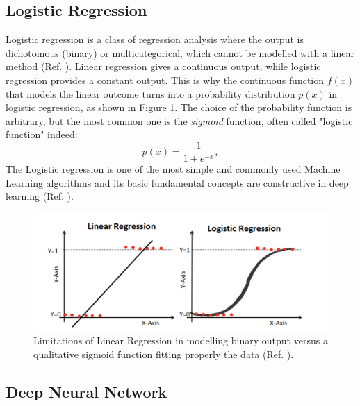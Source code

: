\documentclass[english,notitlepage,reprint,nofootinbib]{revtex4-1}  %
\begin{document}
\subsection{Logistic Regression}
Logistic regression is a class of regression analysis where the output is dichotomous (binary) or multicategorical, which cannot be modelled with a linear method (Ref. \cite{log1}). Linear regression gives a continuous output, while logistic regression provides a constant output. This is why the continuous function $f(x)$ that models the linear outcome turns into a probability distribution $p(x)$ in logistic regression, as shown in Figure \ref{fig:log}. The choice of the probability function is arbitrary, but the most common one is the \textit{sigmoid} function, often called "logistic function" indeed:
$$
p(x) = \frac{1}{1 + e^{-x}},
$$
The Logistic regression is one of the most simple and commonly used Machine Learning algorithms and its basic fundamental concepts are constructive in deep learning (Ref. \cite{log2}).

\begin{figure}[h]
    \centering 
    \includegraphics[scale=0.3]{img/Logistic_Regr.png}
    \caption{Limitations of Linear Regression in modelling binary output versus a qualitative sigmoid function fitting properly the data (Ref. \cite{log2}).}
    \label{fig:log}
\end{figure}

\subsection{Deep Neural Network}
\end{document}
